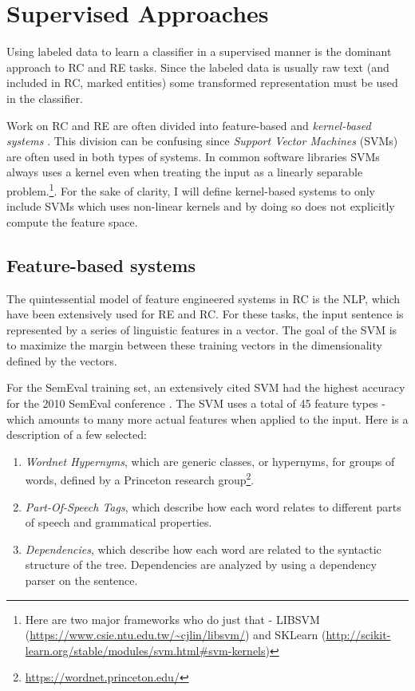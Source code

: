 
\section{Supervised Approaches}

Using labeled data to learn a classifier in a supervised manner is the dominant approach to RC and RE tasks. Since the labeled data is usually raw text (and included in RC, marked entities) some transformed representation must be used in the classifier.    

Work on RC and RE are often divided into feature-based and \emph{kernel-based systems} \cite{re_cnn} \cite{zeng2014}. This division can be confusing since \emph{Support Vector Machines} (SVMs) are often used in both types of systems. In common software libraries SVMs always uses a kernel even when treating the input as a linearly separable problem.\footnote{Here are two major frameworks who do just that - LIBSVM (\url{https://www.csie.ntu.edu.tw/~cjlin/libsvm/}) and SKLearn (\url{http://scikit-learn.org/stable/modules/svm.html\#svm-kernels})}. For the sake of clarity, I will define kernel-based systems to only include SVMs which uses non-linear kernels and by doing so does not explicitly compute the feature space.

\subsection{Feature-based systems}

The quintessential model of feature engineered systems in RC is the NLP, %
which have been extensively used for RE and RC. For these tasks, the input sentence is represented by a series 
of linguistic features in a vector. The goal of the SVM is to maximize the margin between these training vectors in the dimensionality defined by the vectors. 

For the SemEval training set, an extensively cited SVM had the highest accuracy for the 2010 SemEval conference \cite{semevalSVM}. The SVM uses a total of 45 feature types - which amounts to many more actual features when applied to the input. Here is a description of a few selected:

\begin{enumerate}

\item \emph{Wordnet Hypernyms}, which are generic classes, or hypernyms, for groups of words, defined by a Princeton research group\footnote{\url{https://wordnet.princeton.edu/}}.

\item \emph{Part-Of-Speech Tags}, which describe how each word relates to different parts of speech and grammatical properties.

\item \emph{Dependencies}, which describe how each word are related to the syntactic structure of the tree. Dependencies are analyzed by using a dependency parser on the sentence.
\end{enumerate} 

